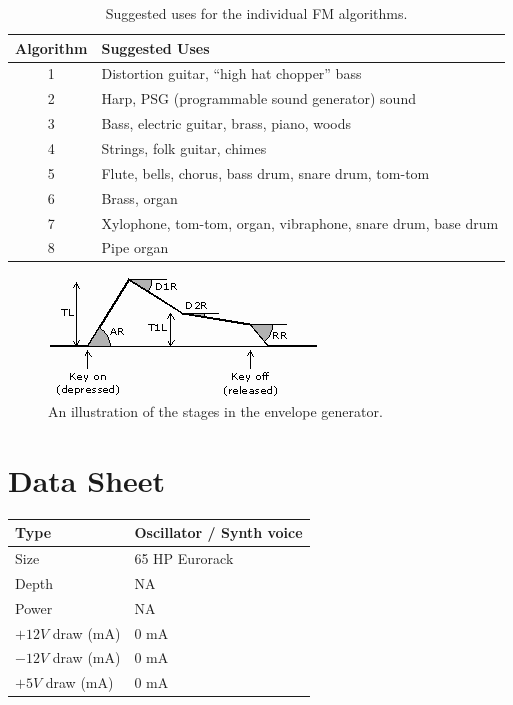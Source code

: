 \documentclass[12pt,letter]{article}
\begin{document}
\begin{table}[!htp]
\centering
\caption{Suggested uses for the individual FM algorithms.}
\label{tab:fm-algorithm-instruments}
\begin{tabular}{|c|l|}
\hline
\textbf{Algorithm} & \textbf{Suggested Uses}                             \\
\hline\hline
1         & Distortion guitar, ``high hat chopper'' bass                 \\
\hline
2         & Harp, PSG (programmable sound generator) sound               \\
\hline
3         & Bass, electric guitar, brass, piano, woods                   \\
\hline
4         & Strings, folk guitar, chimes                                 \\
\hline
5         & Flute, bells, chorus, bass drum, snare drum, tom-tom         \\
\hline
6         & Brass, organ                                                 \\
\hline
7         & Xylophone, tom-tom, organ, vibraphone, snare drum, base drum \\
\hline
8         & Pipe organ                                                   \\
\hline
\end{tabular}
\end{table}

\begin{figure}[!htp]
\centering
\caption{An illustration of the stages in the envelope generator.}
\label{fig:envelope-generator}
\includegraphics[width=\maxwidth{\textwidth}]{envelope}
\end{figure}

\clearpage
\section*{Data Sheet}

\begin{table}[!htp]
\begin{tabular}{|l|l|}
\hline
Type             & Oscillator / Synth voice \\
\hline
Size             & 65 HP Eurorack           \\
\hline
Depth            & NA                       \\
\hline
Power            & NA                       \\ %
\hline
$+12V$ draw (mA) & 0 mA                     \\
\hline
$-12V$ draw (mA) & 0 mA                     \\
\hline
$+5V$ draw (mA)  & 0 mA                     \\
\hline
\end{tabular}
\end{table}


\clearpage
\renewcommand\refname{References \& Acknowledgments}
\nocite{*}


\end{document}
